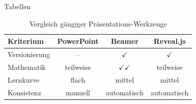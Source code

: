 \begin{frame}{Tabellen}
  \begin{table}
    \centering
    \renewcommand{\arraystretch}{1.25}
    \begin{tabular}{l c c c}
      \toprule
      \textbf{Kriterium} & \textbf{PowerPoint} & \textbf{Beamer} & \textbf{Reveal.js}\\
      \midrule
      Versionierung      & \textcolor{dhbwLight}{--} & \textcolor{dhbwRed}{$\checkmark$} & \textcolor{dhbwRed}{$\checkmark$}\\
      Mathematik         & \textcolor{dhbwMid}{teilweise} & \textcolor{dhbwRed}{$\checkmark\checkmark$} & \textcolor{dhbwMid}{teilweise}\\
      Lernkurve          & \textcolor{dhbwRed}{flach} & \textcolor{dhbwMid}{mittel} & \textcolor{dhbwMid}{mittel}\\
      Konsistenz         & manuell & \textcolor{dhbwRed}{automatisch} & \textcolor{dhbwRed}{automatisch}\\
      \bottomrule
    \end{tabular}
    \caption{Vergleich gängiger Präsentations-Werkzeuge}
  \end{table}
\end{frame}
